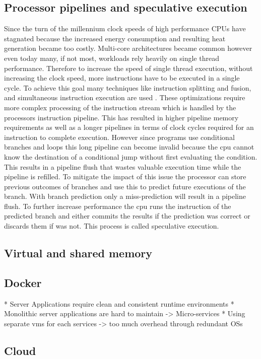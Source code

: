 \documentclass[conference,compsoc,final,a4paper]{IEEEtran}
\begin{document}
\subsection{Processor pipelines and speculative execution}
Since the turn of the millennium clock speeds of high performance CPUs have stagnated because the increased energy consumption and resulting heat generation became
too costly. \cite{fog2012microarchitecture} Multi-core architectures became common however even today many, if not most, workloads rely heavily on single thread performance.
Therefore to increase the speed of single thread execution, without increasing the clock speed, more instructions have to be executed in a single cycle. 
To achieve this goal many techniques like instruction splitting and fusion, and simultaneous instruction execution are used \cite{fog2012microarchitecture}.
These optimizations require more complex processing of the instruction stream which is handled by the processors instruction pipeline. This has resulted in higher pipeline memory requirements
as well as a longer pipelines in terms of clock cycles required for an instruction to complete execution. However since programs use conditional branches and loops this long pipeline can become invalid 
because the cpu cannot know the destination of a conditional jump without first evaluating the condition. This results in a pipeline flush that wastes valuable execution time while the pipeline is refilled.
To mitigate the impact of this issue the processor can store previous outcomes of branches and use this to predict future executions of the branch. With branch prediction only a miss-prediction will result
in a pipeline flush. To further increase performance the cpu runs the instruction of the predicted branch and either commits the results if the prediction was correct or discards them if was not. 
This process is called speculative execution. \cite{kocher2018spectre}
\subsection{Virtual and shared memory}

\subsection{Docker}
* Server Applications require clean and consistent runtime environments
* Monolithic server applications are hard to maintain -> Micro-services
* Using separate vms for each services -> too much overhead through redundant OSs
\subsection{Cloud}
\end{document}
